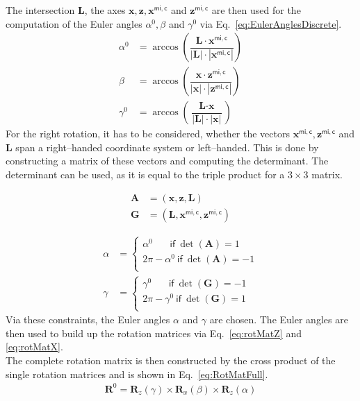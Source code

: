 	The intersection $\textbf{L}$, the axes $\textbf{x},\textbf{z},\textbf{x}^\mathsf{mi,c}$ and $ \textbf{z}^\mathsf{mi,c}$ are then used for the computation of the Euler angles  $\alpha^0, \beta$ and $\gamma^0$ via Eq.~\eqref{eq:EulerAnglesDiscrete}.
	\begin{subequations}
	\label{eq:EulerAnglesDiscrete}
	\begin{align}
		\alpha^{0}  &= \arccos{ \left( \dfrac{\textbf{L} \cdot \textbf{x}^\mathsf{mi,c}}{|\textbf{L}|\cdot |\textbf{x}^\mathsf{mi,c}|}\right) }\\
		\beta &= \arccos{ \left( \dfrac{\textbf{x}	\cdot \textbf{z}^\mathsf{mi,c}}{|\textbf{x}|\cdot |\textbf{z}^\mathsf{mi,c}|} \right)} \\
		\gamma^{0} &= \arccos{ \left( \dfrac{\textbf{L} \cdot  \textbf{x}}{|\textbf{L}|\cdot |\textbf{x}|}\right) }
	\end{align}
\end{subequations}
	For the right rotation, it has to be considered,
	whether the vectors $\textbf{x}^\mathsf{mi,c}, \textbf{z}^\mathsf{mi,c}$ and $\textbf{L}$
	span a right--handed coordinate system or left--handed.
	This is done by constructing a matrix of these vectors and computing the determinant.
	The determinant can be used, as it is equal to the triple product for a $3\times 3$ matrix.
	
	\begin{align}
		\textbf{A} &= (\textbf{x},\textbf{z},\textbf{L}) \\
		\textbf{G} &= (\textbf{L},\textbf{x}^\mathsf{mi,c},\textbf{z}^\mathsf{mi,c})
	\end{align}

\begin{align}
	\alpha &= \begin{cases}
		 \alpha^{0}  ~~~~~~~~\mathsf{if}~ \det (\textbf{A}) = 1  \\
	2\pi - \alpha^{0} ~\mathsf{if}~ \det (\textbf{A}) = -1 \\
	\end{cases} \\
	\gamma   &= \begin{cases}
		\gamma^{0} ~~~~~~~~\mathsf{if}~ \det (\textbf{G}) = -1  \\
		2\pi - \gamma^{0} ~\mathsf{if}~ \det (\textbf{G}) = 1 \\
	\end{cases}
\end{align}
Via these constraints, the Euler angles $\alpha$ and $\gamma$ are chosen.
The Euler angles are then used to build up the rotation matrices via Eq.~\eqref{eq:rotMatZ} and  \eqref{eq:rotMatX}.\\
\newpage
The complete rotation matrix is then constructed by the cross product of the single rotation matrices
and is shown in Eq.~\eqref{eq:RotMatFull}.
\begin{align}
	\label{eq:RotMatFull}
	\textbf{R}^0 = \textbf{R}_z(\gamma)  \times \textbf{R}_x(\beta)\times \textbf{R}_z(\alpha)
\end{align}

